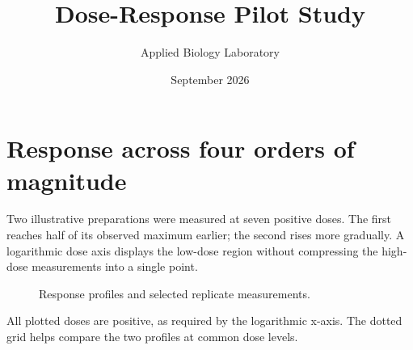 \documentclass{article}
\title{Dose-Response Pilot Study}
\author{Applied Biology Laboratory}
\date{September 2026}
\begin{document}
\maketitle

\section{Response across four orders of magnitude}
Two illustrative preparations were measured at seven positive doses. The
first reaches half of its observed maximum earlier; the second rises more
gradually. A logarithmic dose axis displays the low-dose region without
compressing the high-dose measurements into a single point.

\begin{figure}
\centering
{}
\caption{Response profiles and selected replicate measurements.}
\label{fig:dose-response}
\end{figure}

All plotted doses are positive, as required by the logarithmic x-axis.
The dotted grid helps compare the two profiles at common dose levels.
\end{document}
